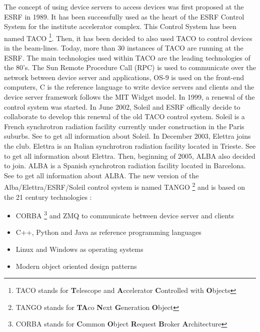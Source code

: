 The concept of using device servers to access devices was first proposed
at the ESRF in 1989. It has been successfully used as the heart of
the ESRF Control System for the institute accelerator
complex. This Control System has been named TACO%
\footnote{TACO stands for \textbf{T}elescope and \textbf{A}ccelerator \textbf{C}ontrolled
with \textbf{O}bjects%
}. Then, it has been decided to also used TACO to control devices in
the beam-lines. Today, more than 30 instances of TACO are running
at the ESRF. The main technologies used within TACO are the leading
technologies of the 80's. The Sun Remote Procedure Call (RPC) is used
to communicate over the network between device server and applications,
OS-9 is used on the front-end computers, C is the reference language
to write device servers and clients and the device server framework
follows the MIT Widget model. In 1999, a renewal of the control system
was started. In June 2002, Soleil and ESRF offically
decide to collaborate to develop this renewal of the old TACO control
system. Soleil is a French synchrotron radiation facility currently
under construction in the Paris suburbs. See \cite{Soleil_home_page}
to get all information about Soleil. In December 2003, Elettra
joins the club. Elettra is an Italian synchrotron radiation facility
located in Trieste. See \cite{Elettra_home_page} to get all information
about Elettra. Then, beginning of 2005, ALBA also decided
to join. ALBA is a Spanish synchrotron radiation facility located
in Barcelona. See \cite{Alba_WEB} to get all information about ALBA.
The new version of the Alba/Elettra/ESRF/Soleil control system is
named TANGO%
\footnote{TANGO stands for \textbf{TA}co \textbf{N}ext \textbf{G}eneration \textbf{O}bject%
} and is based on the 21 century technologies :
\begin{itemize}
\item CORBA%
\footnote{CORBA stands for \textbf{C}ommon \textbf{O}bject \textbf{R}equest
\textbf{B}roker \textbf{A}rchitecture%
} and ZMQ\cite{ZMQ} to communicate between device server
and clients 
\item C++, Python and Java as reference programming languages 
\item Linux and Windows as operating systems 
\item Modern object oriented design patterns\end{itemize}

